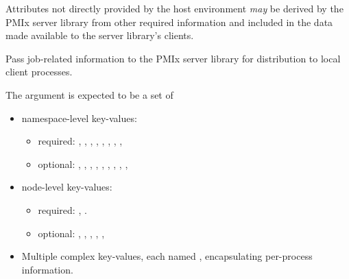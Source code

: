 Attributes not directly provided by the host environment \textit{may} be derived by the \ac{PMIx} server library from other required information and included in the data made available to the server library's clients.

\optattrend

\descr

Pass job-related information to the \ac{PMIx} server library for distribution to local client processes.

The  argument is expected to be a set of
\begin{itemize}
    \item namespace-level key-values: 
    \begin{itemize}
        \item required: , , , , , , , , 
        \item optional: , , , , , , , , , 
    \end{itemize}
    \item node-level key-values: 
    \begin{itemize}
        \item required: , . 
        \item optional: , , , , , 
    \end{itemize}
    \item Multiple complex key-values, each named , encapsulating per-process information.



\end{itemize}
